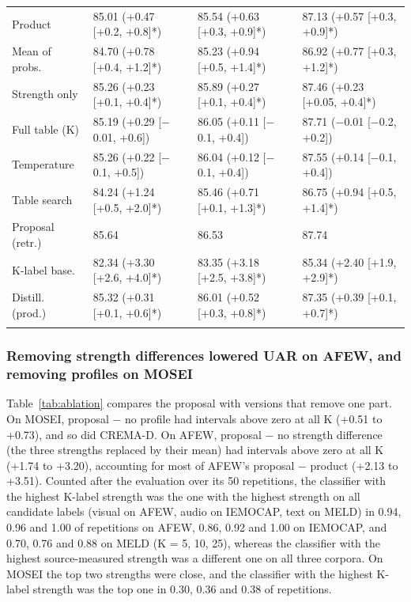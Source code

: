 \begin{table}[p]
\begin{tabular}{@{}llll@{}}
Product & 85.01 (+0.47 [+0.2, +0.8]*) & 85.54 (+0.63 [+0.3, +0.9]*) & 87.13 (+0.57 [+0.3, +0.9]*) \\
Mean of probs. & 84.70 (+0.78 [+0.4, +1.2]*) & 85.23 (+0.94 [+0.5, +1.4]*) & 86.92 (+0.77 [+0.3, +1.2]*) \\
Strength only & 85.26 (+0.23 [+0.1, +0.4]*) & 85.89 (+0.27 [+0.1, +0.4]*) & 87.46 (+0.23 [+0.05, +0.4]*) \\
Full table (K) & 85.19 (+0.29 [$-$0.01, +0.6]) & 86.05 (+0.11 [$-$0.1, +0.4]) & 87.71 ($-$0.01 [$-$0.2, +0.2]) \\
Temperature & 85.26 (+0.22 [$-$0.1, +0.5]) & 86.04 (+0.12 [$-$0.1, +0.4]) & 87.55 (+0.14 [$-$0.1, +0.4]) \\
Table search & 84.24 (+1.24 [+0.5, +2.0]*) & 85.46 (+0.71 [+0.1, +1.3]*) & 86.75 (+0.94 [+0.5, +1.4]*) \\
Proposal (retr.) & 85.64 & 86.53 & 87.74 \\
K-label base. & 82.34 (+3.30 [+2.6, +4.0]*) & 83.35 (+3.18 [+2.5, +3.8]*) & 85.34 (+2.40 [+1.9, +2.9]*) \\
Distill. (prod.) & 85.32 (+0.31 [+0.1, +0.6]*) & 86.01 (+0.52 [+0.3, +0.8]*) & 87.35 (+0.39 [+0.1, +0.7]*) \\
\botrule
\end{tabular}
\end{table}


\subsubsection{Removing strength differences lowered UAR on AFEW, and removing profiles on MOSEI}
Table~\ref{tab:ablation} compares the proposal with versions that remove one part. On MOSEI, proposal $-$ no profile had intervals above zero at all K (+0.51 to +0.73\pt), and so did CREMA-D. On AFEW, proposal $-$ no strength difference (the three strengths replaced by their mean) had intervals above zero at all K (+1.74 to +3.20\pt), accounting for most of AFEW's proposal $-$ product (+2.13 to +3.51\pt). Counted after the evaluation over its 50 repetitions, the classifier with the highest K-label strength was the one with the highest strength on all candidate labels (visual on AFEW, audio on IEMOCAP, text on MELD) in 0.94, 0.96 and 1.00 of repetitions on AFEW, 0.86, 0.92 and 1.00 on IEMOCAP, and 0.70, 0.76 and 0.88 on MELD (K = 5, 10, 25), whereas the classifier with the highest source-measured strength was a different one on all three corpora. On MOSEI the top two strengths were close, and the classifier with the highest K-label strength was the top one in 0.30, 0.36 and 0.38 of repetitions.

